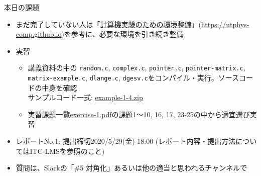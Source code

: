 \documentclass[10pt,dvipdfmx]{beamer}
\begin{document}











%




%




\begin{frame}[t]{本日の課題}
  \begin{itemize}
  \item まだ完了していない人は「\href{https://utphys-comp.github.io}{計算機実験のための環境整備}」({\small \href{https://utphys-comp.github.io}{https://utphys-comp.github.io}})を参考に、必要な環境を引き続き整備
  \item 実習
    \begin{itemize}
    \item 講義資料の中の {\tt random.c}, {\tt complex.c}, {\tt pointer.c}, {\tt pointer-matrix.c}, {\tt matrix-example.c}, {\tt dlange.c}, {\tt dgesv.c}をコンパイル・実行。ソースコードの中身を確認 \\
      サンプルコード一式: \href{https://github.com/todo-group/ComputerExperiments/releases/tag/2020s-computer1}{example-1-4.zip}
    \item 実習課題一覧\href{https://github.com/todo-group/ComputerExperiments/releases/tag/2020s-computer1}{exercise-1.pdf}の課題1〜10, 16, 17, 23-25の中から適宜選び実習
    \end{itemize}
  \item レポートNo.1: 提出締切2020/5/29(金) 18:00 (レポート内容・提出方法についてはITC-LMSを参照のこと)
  \item 質問は、Slackの「\#5 対角化」あるいは他の適当と思われるチャンネルで
  \end{itemize}
\end{frame}
\end{document}
